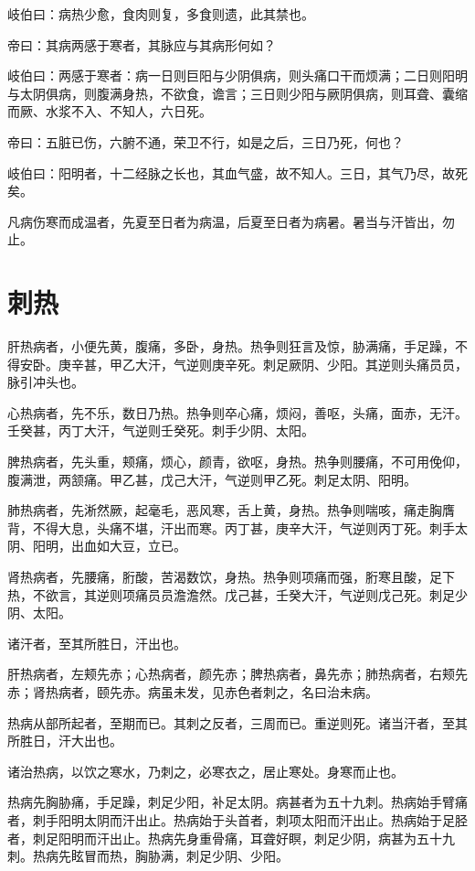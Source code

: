\documentclass{article}%
\begin{document}
岐伯曰：病热少愈，食肉则复，多食则遗，此其禁也。

帝曰：其病两感于寒者，其脉应与其病形何如？

岐伯曰：两感于寒者：病一日则巨阳与少阴俱病，则头痛口干而烦满；二日则阳明与太阴俱病，则腹满身热，不欲食，谵言；三日则少阳与厥阴俱病，则耳聋、囊缩而厥、水浆不入、不知人，六日死。

帝曰：五脏已伤，六腑不通，荣卫不行，如是之后，三日乃死，何也？

岐伯曰：阳明者，十二经脉之长也，其血气盛，故不知人。三日，其气乃尽，故死矣。

凡病伤寒而成温者，先夏至日者为病温，后夏至日者为病暑。暑当与汗皆出，勿止。


\section{刺热}
肝热病者，小便先黄，腹痛，多卧，身热。热争则狂言及惊，胁满痛，手足躁，不得安卧。庚辛甚，甲乙大汗，气逆则庚辛死。刺足厥阴、少阳。其逆则头痛员员，脉引冲头也。

心热病者，先不乐，数日乃热。热争则卒心痛，烦闷，善呕，头痛，面赤，无汗。壬癸甚，丙丁大汗，气逆则壬癸死。刺手少阴、太阳。

脾热病者，先头重，颊痛，烦心，颜青，欲呕，身热。热争则腰痛，不可用俛仰，腹满泄，两颔痛。甲乙甚，戊己大汗，气逆则甲乙死。刺足太阴、阳明。

肺热病者，先淅然厥，起毫毛，恶风寒，舌上黄，身热。热争则喘咳，痛走胸膺背，不得大息，头痛不堪，汗出而寒。丙丁甚，庚辛大汗，气逆则丙丁死。刺手太阴、阳明，出血如大豆，立已。

肾热病者，先腰痛，胻酸，苦渴数饮，身热。热争则项痛而强，胻寒且酸，足下热，不欲言，其逆则项痛员员澹澹然。戊己甚，壬癸大汗，气逆则戊己死。刺足少阴、太阳。

诸汗者，至其所胜日，汗出也。

肝热病者，左颊先赤；心热病者，颜先赤；脾热病者，鼻先赤；肺热病者，右颊先赤；肾热病者，颐先赤。病虽未发，见赤色者刺之，名曰治未病。

热病从部所起者，至期而已。其刺之反者，三周而已。重逆则死。诸当汗者，至其所胜日，汗大出也。

诸治热病，以饮之寒水，乃刺之，必寒衣之，居止寒处。身寒而止也。

热病先胸胁痛，手足躁，刺足少阳，补足太阴。病甚者为五十九刺。热病始手臂痛者，刺手阳明太阴而汗出止。热病始于头首者，刺项太阳而汗出止。热病始于足胫者，刺足阳明而汗出止。热病先身重骨痛，耳聋好瞑，刺足少阴，病甚为五十九刺。热病先眩冒而热，胸胁满，刺足少阴、少阳。
\end{document}
